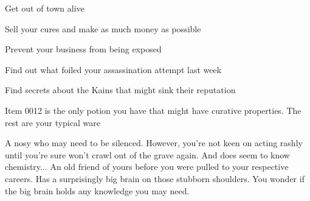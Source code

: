 \documentclass[char]{Pestilence}
\begin{document}
\begin{itemz}[Goals]
	\item Get out of town alive
	\item Sell your cures and make as much money as possible
	\item Prevent your business from being exposed
	\item Find out what foiled your assassination attempt last week
	\item Find secrets about the Kains that might sink their reputation
\end{itemz}

\begin{itemz}[Notes]
	\item Item 0012 is the only potion you have that might have curative properties. The rest are your typical ware
\end{itemz}

\begin{contacts}
	\contact{\cOutsider{}} A nosy \cOutsider{\human} who may need to be silenced. However, you're not keen on acting rashly until you're sure \cOutsider{\they} won't crawl out of the grave again. And \cOutsider{\they} does seem to know \cOutsider{\their} chemistry...
	\contact{\cApprentice{}} An old friend of yours before you were pulled to your respective careers. Has a surprisingly big brain on those stubborn shoulders. You wonder if the big brain holds any knowledge you may need.
\end{contacts}
\end{document}
